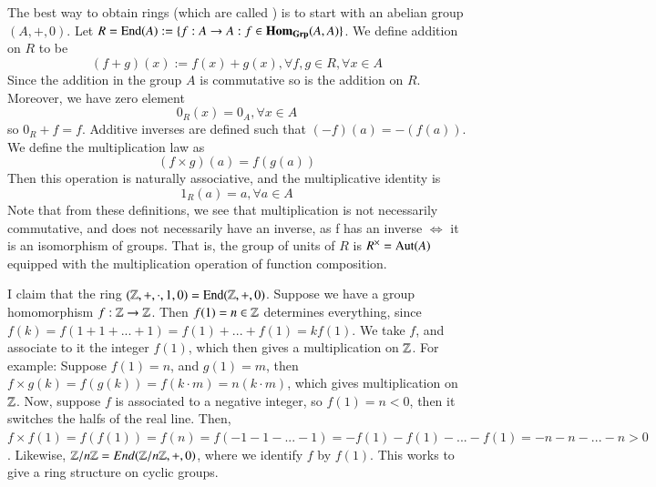 \documentclass[12pt, a4paper, oneside, openright, titlepage]{book}
\begin{document}
\begin{cons}
    The best way to obtain rings (which are called ) is to start with an abelian group $(A,+,0)$. Let $R = \operatorname{End}(A) := \{f:A\rightarrow A: f \in \mathbf{Hom}_{\normalfont\textbf{Grp}}(A,A)\}$. We define addition on $R$ to be \begin{equation}
        (f+g)(x) := f(x)+g(x), \forall f,g \in R, \forall x \in A
    \end{equation}
    Since the addition in the group $A$ is commutative so is the addition on $R$. Moreover, we have zero element \begin{equation}
        0_R(x) = 0_A,\forall x \in A
    \end{equation}
    so $0_R  + f = f$. Additive inverses are defined such that $(-f)(a) = -(f(a))$. We define the multiplication law as \begin{equation}
        (f\times g)(a) = f(g(a))
    \end{equation}
    Then this operation is naturally associative, and the multiplicative identity is \begin{equation}
        1_R(a) = a, \forall a \in A
    \end{equation}
    Note that from these definitions, we see that multiplication is not necessarily commutative, and does not necessarily have an inverse, as f has an inverse $\iff$ it is an isomorphism of groups. That is, the group of units of $R$ is $R^{\times} = \operatorname{Aut}(A)$ equipped with the multiplication operation of function composition.
\end{cons}

\begin{eg}
        I claim that the ring $(\mathbb Z,+,\cdot,1,0) = \operatorname{End}(\mathbb Z,+,0)$. Suppose we have a group homomorphism $f:\mathbb Z\rightarrow \mathbb Z$. Then $f(1) = n \in \mathbb Z$ determines everything, since $f(k) = f(1+1+...+1) = f(1)+...+f(1) = kf(1)$. We take $f$, and associate to it the integer $f(1)$, which then gives a multiplication on $\mathbb Z$. For example: Suppose $f(1) = n$, and $g(1) = m$, then $f\times g(k) = f(g(k)) = f(k\cdot m) = n(k\cdot m)$, which gives multiplication on $\mathbb Z$. Now, suppose $f$ is associated to a negative integer, so $f(1) = n < 0$, then it switches the halfs of the real line. Then, $f\times f(1) = f(f(1)) = f(n) = f(-1-1-...-1) = -f(1)-f(1)-...-f(1) = -n-n-...-n > 0$. Likewise, $\mathbb Z/n\mathbb Z = End(\mathbb Z/n\mathbb Z,+,0)$, where we identify $f$ by $f(1)$. This works to give a ring structure on cyclic groups.
\end{eg}
\end{document}
